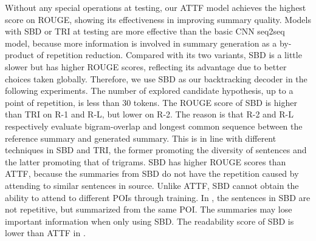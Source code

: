 Without any special operations at testing, 
our ATTF model achieves the highest score on ROUGE, showing
its effectiveness in improving summary quality.
Models with SBD or TRI at testing
are more effective than the basic CNN seq2seq model,
because more information is involved in summary generation 
as a by-product of repetition reduction.
Compared with its two variants, SBD is a little slower 
but has higher ROUGE scores, reflecting its advantage due to
better choices taken globally.
Therefore, 
we use SBD as our backtracking decoder in the following experiments. 
The number of explored candidate hypothesis, up to a point of
repetition, is less than 30 tokens.
The ROUGE score of SBD is higher than TRI on R-1 and R-L, but lower on R-2. 
The reason is that R-2 and R-L respectively evaluate
bigram-overlap and longest common sequence between the reference
summary and generated summary. This is in line with different techniques 
in SBD and TRI, the former promoting the diversity of sentences and 
the latter promoting that of trigrams.
SBD has higher ROUGE scores than ATTF, 
because the summaries from
SBD do not have the repetition caused by attending to similar sentences in source.
Unlike ATTF, 
SBD cannot obtain the ability to attend to different POIs through training.
In , the sentences in SBD are not repetitive, 
but summarized from the same POI.
The summaries may lose important information when only using SBD.
The readability score of SBD is lower than ATTF in .

